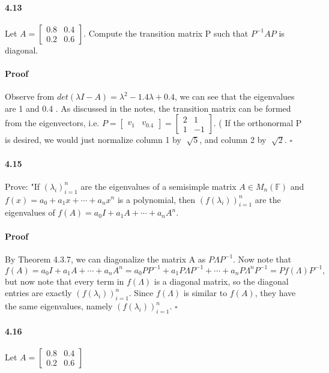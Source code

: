 \documentclass[letterpaper,12pt]{article}
\theoremstyle{definition}
\begin{document}
\paragraph{4.13} Let $A =
\begin{bmatrix}
0.8 & 0.4 \\
0.2 & 0.6
\end{bmatrix}$. Compute the transition matrix P such that $P^{-1}AP$ is diagonal.

\paragraph{Proof} Observe from $det(\lambda I - A)=  \lambda^2 - 1.4 \lambda + 0.4 $, we can see that the eigenvalues are 1 and 0.4 . As discussed in the notes, the transition matrix can be formed from the eigenvectors, i.e.
$P = \begin{bmatrix}
v_{1} & v_{0.4} 
\end{bmatrix}
= \begin{bmatrix}
2 & 1 \\
1 & -1
\end{bmatrix}$. ( If the orthonormal P is desired, we would just normalize column 1 by $\sqrt[]{5}$, and column 2 by $\sqrt[]{2}$. $\square$
   
   
\paragraph{4.15} Prove: "If $(\lambda_i)_{i = 1}^n$ are the eigenvalues of a semisimple matrix $A \in M_n(\mathbb{F})$ and $f(x) = a_0 + a_1x + \cdots + a_n x^n$ is a polynomial, then $(f(\lambda_i))_{i = 1}^n$ are the eigenvalues of $f(A) = a_0I+ a_1A + \cdots + a_n A^n$.

\paragraph{Proof} By Theorem 4.3.7, we can diagonalize the matrix A as $P \Lambda P^{-1}$.
Now note that $f(A) = a_0I+ a_1A + \cdots + a_n A^n
= a_0P  P^{-1}+ a_1 P \Lambda P^{-1} + \cdots + a_n P \Lambda^n P^{-1}
= P f(\Lambda) P^{-1},$ but now note that every term in $f(\Lambda)$ is a diagonal matrix, so the diagonal entries are exactly $(f(\lambda_i))_{i = 1}^n$. Since $f(\Lambda)$ is similar to $f(A)$, they have the same eigenvalues, namely $(f(\lambda_i))_{i = 1}^n$.  $\square$

\paragraph{4.16} Let $A =
\begin{bmatrix}
0.8 & 0.4 \\
0.2 & 0.6
\end{bmatrix}$ 
\end{document}
